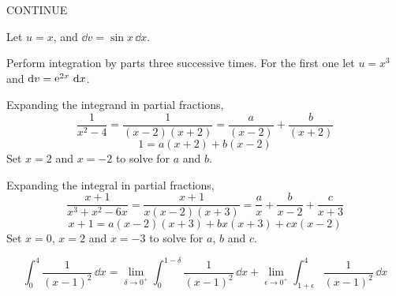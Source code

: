 \begin{Hint}
  \label{hint bounded -1 1 length}
  CONTINUE
\end{Hint}







\begin{Hint}
  \label{hint int x sin x}
  Let $u=x$, and $\dd v = \sin x \,\dd x$.  
\end{Hint}




\begin{Hint}
  \label{hint int x3 e2x}
  Perform integration by parts three successive times.  For the first one 
  let $u = x^3$ and $\mathrm{d} v = \mathop{\mathrm{e}}\nolimits^{2x}\,\mathrm{d} x$.  
\end{Hint}



\begin{Hint}
  \label{hint int 1 / x2-4}
  Expanding the integrand in partial fractions,
  \[
  \frac{1}{x^2-4} = \frac{1}{(x-2)(x+2)} = \frac{a}{(x-2)} + \frac{b}{(x+2)}
  \]
  \[
  1 = a (x+2) + b (x-2)
  \]
  Set $x=2$ and $x = -2$ to solve for $a$ and $b$.
\end{Hint}



\begin{Hint}
  \label{hint int x+1 / x3+x2-6x}
  Expanding the integral in partial fractions,
  \[
  \frac{x+1}{x^3+x^2-6x} = \frac{x+1}{x(x-2)(x+3)}
  = \frac{a}{x} + \frac{b}{x-2} + \frac{c}{x+3}
  \]
  \[
  x+1 = a (x-2)(x+3) + b x(x+3) + c x(x-2)
  \]
  Set $x=0$, $x=2$ and $x=-3$ to solve for $a$, $b$ and $c$.
\end{Hint}









\begin{Hint}
  \label{hint int 0 4 1 / (x-1)2}
  \[
  \int_0^4 \frac{1}{(x-1)^2} \,\dd x
  = \lim_{\delta \to 0^+} \int_0^{1-\delta}
  \frac{1}{(x-1)^2} \, \dd x +
  \lim_{\epsilon \to 0^+} \int_{1+\epsilon}^4
  \frac{1}{(x-1)^2} \, \dd x
  \] 
\end{Hint}



